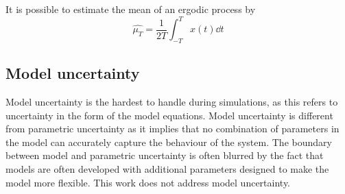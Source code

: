 It is possible to estimate the mean of an ergodic process by 
\begin{equation}
  \hat{\mu_T} = \frac{1}{2T} \int_{-T}^{T} x(t) \dd t
\end{equation}


\subsection{Model uncertainty}
Model uncertainty is the hardest to handle during simulations, as this refers to uncertainty in the form of the model equations.  
Model uncertainty is different from parametric uncertainty as it implies that no combination of parameters in the model can accurately capture the behaviour of the system.  
The boundary between model and parametric uncertainty is often blurred by the fact that models are often developed with additional parameters designed to make the model more flexible.  
This work does not address model uncertainty.


